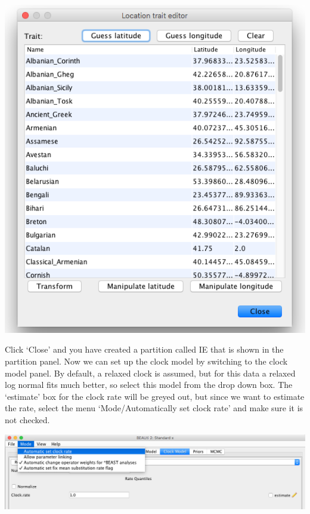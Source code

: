 \documentclass{article}
\begin{document}
\begin{center}
\includegraphics[scale=0.4]{figures/BEAUti_transform4}
\end{center}

Click `Close' and you have created a partition called IE that is shown in the partition panel. Now we can set up the clock model by switching to the clock model panel. By default, a relaxed clock is assumed, but for this data a relaxed log normal fits much better, so select this model from the drop down box. The `estimate' box for the clock rate will be greyed out, but since we want to estimate the rate, select the menu `Mode/Automatically set clock rate' and make sure it is not checked. 

\begin{center}
\includegraphics[scale=0.4]{figures/BEAUti_transform5}
\end{center}
\end{document}
